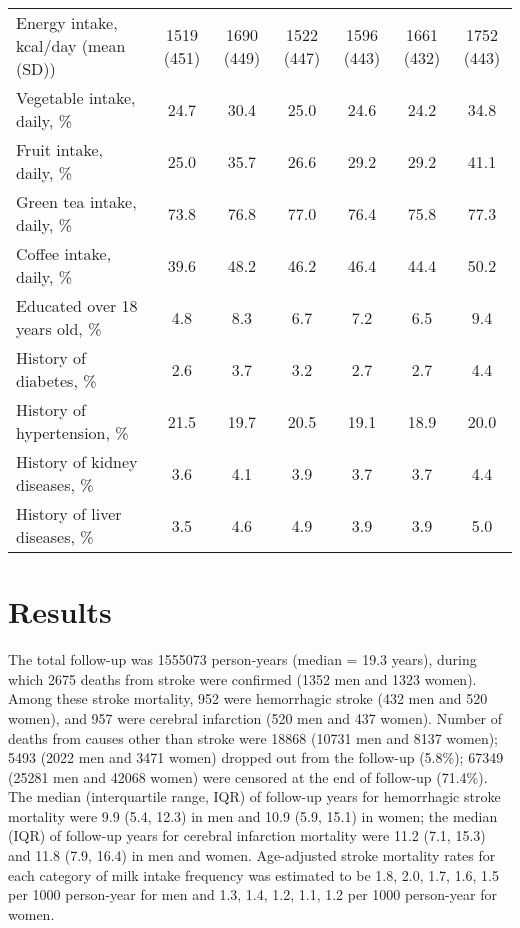 \documentclass[nutrients,article,submitted,moreauthors,pdftex]{mdpi}
\begin{document}
\begin{table}[h]
{\begin{tabular}[t]{lcccccc}
\hspace{1em}Energy intake, kcal/day (mean (SD)) & 1519 (451) & 1690 (449) & 1522 (447) & 1596 (443) & 1661 (432) & 1752 (443)\\
\hspace{1em}Vegetable intake, daily, \% & 24.7 & 30.4 & 25.0 & 24.6 & 24.2 & 34.8\\
\rowcolor{gray!6}  \hspace{1em}Fruit intake, daily, \% & 25.0 & 35.7 & 26.6 & 29.2 & 29.2 & 41.1\\
\hspace{1em}Green tea intake, daily, \% & 73.8 & 76.8 & 77.0 & 76.4 & 75.8 & 77.3\\
\rowcolor{gray!6}  \hspace{1em}Coffee intake, daily, \% & 39.6 & 48.2 & 46.2 & 46.4 & 44.4 & 50.2\\
\hspace{1em}Educated over 18 years old, \% & 4.8 & 8.3 & 6.7 & 7.2 & 6.5 & 9.4\\
\rowcolor{gray!6}  \hspace{1em}History of diabetes, \% & 2.6 & 3.7 & 3.2 & 2.7 & 2.7 & 4.4\\
\hspace{1em}History of hypertension, \% & 21.5 & 19.7 & 20.5 & 19.1 & 18.9 & 20.0\\
\rowcolor{gray!6}  \hspace{1em}History of kidney diseases, \% & 3.6 & 4.1 & 3.9 & 3.7 & 3.7 & 4.4\\
\hspace{1em}History of liver diseases, \% & 3.5 & 4.6 & 4.9 & 3.9 & 3.9 & 5.0\\
\bottomrule
\end{tabular}}
\end{table}

\hypertarget{results}{%
\section{Results}\label{results}}

The total follow-up was 1555073 person-years (median = 19.3 years),
during which 2675 deaths from stroke were confirmed (1352 men and 1323
women). Among these stroke mortality, 952 were hemorrhagic stroke (432
men and 520 women), and 957 were cerebral infarction (520 men and 437
women). Number of deaths from causes other than stroke were 18868 (10731
men and 8137 women); 5493 (2022 men and 3471 women) dropped out from the
follow-up (5.8\%); 67349 (25281 men and 42068 women) were censored at
the end of follow-up (71.4\%). The median (interquartile range, IQR) of
follow-up years for hemorrhagic stroke mortality were 9.9 (5.4, 12.3) in
men and 10.9 (5.9, 15.1) in women; the median (IQR) of follow-up years
for cerebral infarction mortality were 11.2 (7.1, 15.3) and 11.8 (7.9,
16.4) in men and women. Age-adjusted stroke mortality rates for each
category of milk intake frequency was estimated to be 1.8, 2.0, 1.7,
1.6, 1.5 per 1000 person-year for men and 1.3, 1.4, 1.2, 1.1, 1.2 per
1000 person-year for women.
\end{document}
